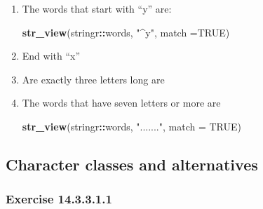 \documentclass[]{book}
\newenvironment{Shaded}{\begin{snugshade}}{\end{snugshade}}
\newcommand{\DataTypeTok}[1]{\textcolor[rgb]{0.13,0.29,0.53}{#1}}
\newcommand{\KeywordTok}[1]{\textcolor[rgb]{0.13,0.29,0.53}{\textbf{#1}}}
\newcommand{\NormalTok}[1]{#1}
\newcommand{\OperatorTok}[1]{\textcolor[rgb]{0.81,0.36,0.00}{\textbf{#1}}}
\newcommand{\OtherTok}[1]{\textcolor[rgb]{0.56,0.35,0.01}{#1}}
\newcommand{\StringTok}[1]{\textcolor[rgb]{0.31,0.60,0.02}{#1}}
\theoremstyle{plain}
\theoremstyle{remark}
\begin{document}
\begin{enumerate}
\def\labelenumi{\arabic{enumi}.}
\item
  The words that start with ``y'' are:

\begin{Shaded}
\begin{Highlighting}[]
\KeywordTok{str_view}\NormalTok{(stringr}\OperatorTok{::}\NormalTok{words, }\StringTok{"^y"}\NormalTok{, }\DataTypeTok{match =}\OtherTok{TRUE}\NormalTok{)}
\end{Highlighting}
\end{Shaded}
\item
  End with ``x''

\begin{Shaded}
\end{Shaded}
\item
  Are exactly three letters long are

\begin{Shaded}
\end{Shaded}
\item
  The words that have seven letters or more are

\begin{Shaded}
\begin{Highlighting}[]
\KeywordTok{str_view}\NormalTok{(stringr}\OperatorTok{::}\NormalTok{words, }\StringTok{"......."}\NormalTok{, }\DataTypeTok{match =} \OtherTok{TRUE}\NormalTok{)}
\end{Highlighting}
\end{Shaded}
\end{enumerate}

\hypertarget{character-classes-and-alternatives}{%
\subsection{Character classes and alternatives}\label{character-classes-and-alternatives}}

\hypertarget{exercise-14.3.3.1.1}{%
\subsubsection*{\texorpdfstring{Exercise {14.3.3.1.1}}{Exercise 14.3.3.1.1}}\label{exercise-14.3.3.1.1}}
\end{document}
